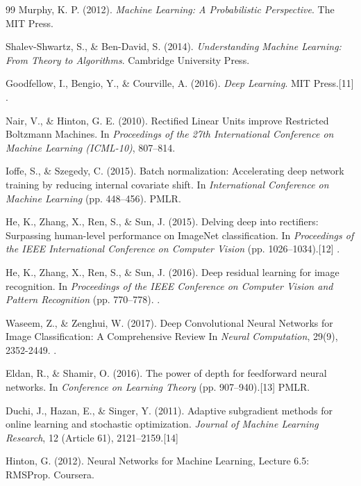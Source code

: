 \begin{thebibliography}{99}
	Murphy, K. P. (2012).
	\emph{Machine Learning: A Probabilistic Perspective}.
	The MIT Press.
	
	Shalev-Shwartz, S., \& Ben-David, S. (2014).
	\emph{Understanding Machine Learning: From Theory to Algorithms}.
	Cambridge University Press.
	
	Goodfellow, I., Bengio, Y., \& Courville, A. (2016). 
	\emph{Deep Learning}. 
	MIT Press.[11]
	.
	
	Nair, V., \& Hinton, G. E. (2010). 
	Rectified Linear Units improve Restricted Boltzmann Machines. 
	In \emph{Proceedings of the 27th International Conference on Machine Learning (ICML-10)}, 807--814.
	
	Ioffe, S., \& Szegedy, C. (2015). 
	Batch normalization: Accelerating deep network training by reducing internal covariate shift. 
	In \emph{International Conference on Machine Learning} (pp. 448--456). 
	PMLR.
	
	He, K., Zhang, X., Ren, S., \& Sun, J. (2015). 
	Delving deep into rectifiers: Surpassing human-level performance on ImageNet classification. 
	In \emph{Proceedings of the IEEE International Conference on Computer Vision} (pp. 1026--1034).[12]
	.
	
	He, K., Zhang, X., Ren, S., \& Sun, J. (2016). 
	Deep residual learning for image recognition. 
	In \emph{Proceedings of the IEEE Conference on Computer Vision and Pattern Recognition} (pp. 770--778). 
	.
	
	Waseem, Z., \& Zenghui, W. (2017).
	Deep Convolutional Neural Networks for Image Classification: A Comprehensive Review
	In \emph{Neural Computation}, 29(9), 2352-2449.
	.
	
	Eldan, R., \& Shamir, O. (2016). 
	The power of depth for feedforward neural networks. 
	In \emph{Conference on Learning Theory} (pp. 907--940).[13] 
	PMLR.
	
	Duchi, J., Hazan, E., \& Singer, Y. (2011).
	Adaptive subgradient methods for online learning and stochastic optimization.
	\emph{Journal of Machine Learning Research}, 12 (Article 61), 2121--2159.[14]
	
	Hinton, G. (2012).
	Neural Networks for Machine Learning, Lecture 6.5: RMSProp.
	Coursera.
	

\end{thebibliography}
